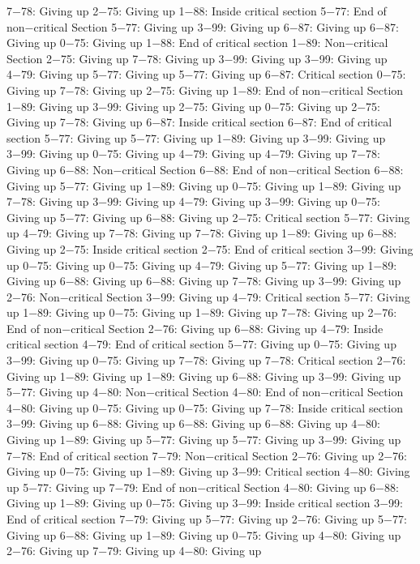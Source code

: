 7−78: Giving up
2−75: Giving up
1−88: Inside critical section
5−77: End of non−critical Section
5−77: Giving up
3−99: Giving up
6−87: Giving up
6−87: Giving up
0−75: Giving up
1−88: End of critical section
1−89: Non−critical Section
2−75: Giving up
7−78: Giving up
3−99: Giving up
3−99: Giving up
4−79: Giving up
5−77: Giving up
5−77: Giving up
6−87: Critical section
0−75: Giving up
7−78: Giving up
2−75: Giving up
1−89: End of non−critical Section
1−89: Giving up
3−99: Giving up
2−75: Giving up
0−75: Giving up
2−75: Giving up
7−78: Giving up
6−87: Inside critical section
6−87: End of critical section
5−77: Giving up
5−77: Giving up
1−89: Giving up
3−99: Giving up
3−99: Giving up
0−75: Giving up
4−79: Giving up
4−79: Giving up
7−78: Giving up
6−88: Non−critical Section
6−88: End of non−critical Section
6−88: Giving up
5−77: Giving up
1−89: Giving up
0−75: Giving up
1−89: Giving up
7−78: Giving up
3−99: Giving up
4−79: Giving up
3−99: Giving up
0−75: Giving up
5−77: Giving up
6−88: Giving up
2−75: Critical section
5−77: Giving up
4−79: Giving up
7−78: Giving up
7−78: Giving up
1−89: Giving up
6−88: Giving up
2−75: Inside critical section
2−75: End of critical section
3−99: Giving up
0−75: Giving up
0−75: Giving up
4−79: Giving up
5−77: Giving up
1−89: Giving up
6−88: Giving up
6−88: Giving up
7−78: Giving up
3−99: Giving up
2−76: Non−critical Section
3−99: Giving up
4−79: Critical section
5−77: Giving up
1−89: Giving up
0−75: Giving up
1−89: Giving up
7−78: Giving up
2−76: End of non−critical Section
2−76: Giving up
6−88: Giving up
4−79: Inside critical section
4−79: End of critical section
5−77: Giving up
0−75: Giving up
3−99: Giving up
0−75: Giving up
7−78: Giving up
7−78: Critical section
2−76: Giving up
1−89: Giving up
1−89: Giving up
6−88: Giving up
3−99: Giving up
5−77: Giving up
4−80: Non−critical Section
4−80: End of non−critical Section
4−80: Giving up
0−75: Giving up
0−75: Giving up
7−78: Inside critical section
3−99: Giving up
6−88: Giving up
6−88: Giving up
6−88: Giving up
4−80: Giving up
1−89: Giving up
5−77: Giving up
5−77: Giving up
3−99: Giving up
7−78: End of critical section
7−79: Non−critical Section
2−76: Giving up
2−76: Giving up
0−75: Giving up
1−89: Giving up
3−99: Critical section
4−80: Giving up
5−77: Giving up
7−79: End of non−critical Section
4−80: Giving up
6−88: Giving up
1−89: Giving up
0−75: Giving up
3−99: Inside critical section
3−99: End of critical section
7−79: Giving up
5−77: Giving up
2−76: Giving up
5−77: Giving up
6−88: Giving up
1−89: Giving up
0−75: Giving up
4−80: Giving up
2−76: Giving up
7−79: Giving up
4−80: Giving up
